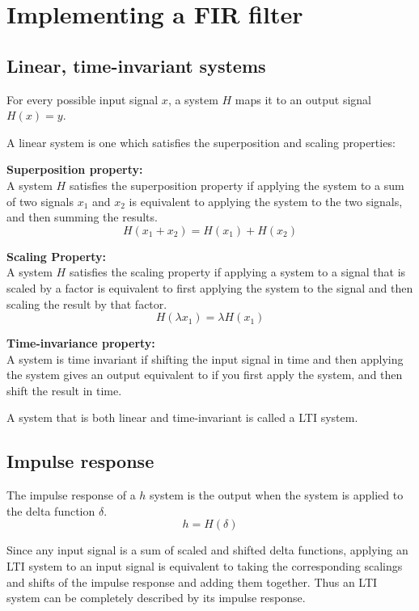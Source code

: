 \section{Implementing a FIR filter}

\subsection{Linear, time-invariant systems}
For every possible input signal $x$, a system $H$ maps it to an output signal $H(x) = y$.

\begin{center}\end{center}
A linear system is one which satisfies the superposition and scaling properties:

\textbf{Superposition property:}\\
A system $H$ satisfies the superposition property if applying the system to a sum
of two signals $x_1$ and $x_2$ is equivalent to applying the system to the two signals,
and then summing the results.
$$H(x_1 + x_2) = H(x_1) + H(x_2)$$

\textbf{Scaling Property:}\\
A system $H$ satisfies the scaling property if applying a system to a signal that is scaled by a factor
is equivalent to first applying the system to the signal and then scaling the result by that factor.
$$H(\lambda x_1) = \lambda H(x_1)$$


\textbf{Time-invariance property:}\\
A system is time invariant if shifting the input signal in time and then
applying the system gives an output equivalent to if you first apply the system, 
and then shift the result in time.

\begin{center}\end{center}

A system that is both linear and time-invariant is called a LTI system.

\pagebreak 

\subsection{Impulse response}
The impulse response of a $h$ system is the output when the system is applied to the delta function $\delta$.
$$h = H(\delta)$$

\begin{center}\end{center}
Since any input signal is a sum of scaled and shifted delta functions, applying an 
LTI system to an input signal is equivalent to taking the corresponding scalings and 
shifts of the impulse response and adding them together. 
Thus an LTI system can be completely described by its impulse response.

